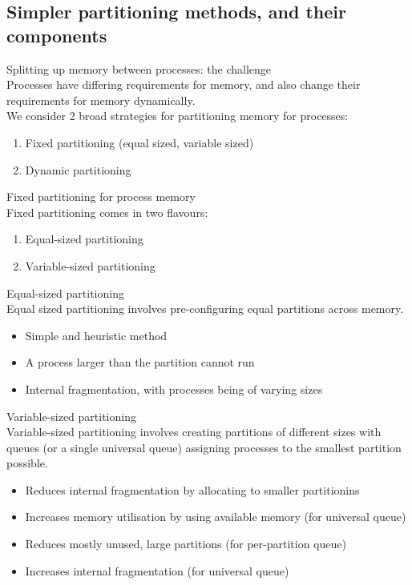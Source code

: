 \documentclass[journal, letterpaper]{IEEEtran}
\begin{document}
\subsection{Simpler partitioning methods, and their components}
\begin{aside}{Splitting up memory between processes: the challenge} \\
    Processes have differing requirements for memory, and also change their 
    requirements for memory dynamically.
    \newline \\
    We consider 2 broad strategies for partitioning memory for processes:
    \begin{enumerate}
        \item Fixed partitioning (equal sized, variable sized)
        \item Dynamic partitioning
    \end{enumerate}
\end{aside}
\begin{theory}{Fixed partitioning for process memory} \\
    Fixed partitioning comes in two flavours:
    \begin{enumerate}
        \item Equal-sized partitioning
        \item Variable-sized partitioning
    \end{enumerate}
    \begin{aside}{Equal-sized partitioning} \\ Equal sized partitioning involves pre-configuring equal partitions across memory.
    \begin{itemize}
        \item[\ding{51}] Simple and heuristic method
        \item[\ding{55}] A process larger than the partition cannot run
        \item[\ding{55}] Internal fragmentation, with processes being of varying sizes  
    \end{itemize}
    \end{aside}
    \begin{aside}{Variable-sized partitioning} \\ Variable-sized partitioning involves creating partitions of different sizes with queues (or a single universal queue) assigning processes to the smallest partition possible.
    \begin{itemize}
        \item[\ding{51}] Reduces internal fragmentation by allocating to smaller partitionins
        \item[\ding{51}] Increases memory utilisation by using available memory (for universal queue)
        \item[\ding{55}] Reduces mostly unused, large partitions (for per-partition queue)
        \item[\ding{55}] Increases internal fragmentation (for universal queue)
    \end{itemize}
    \end{aside}
\end{theory}
\end{document}

